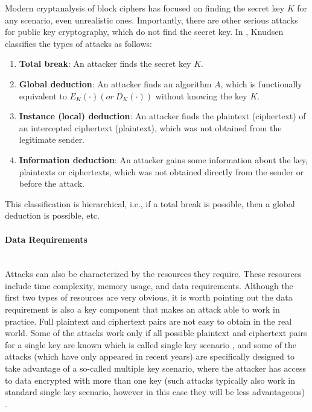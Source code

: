 Modern cryptanalysis of block ciphers has focused on finding the secret key $K$ for any scenario, even unrealistic ones. Importantly, there are other serious attacks for public key cryptography, which do not find the secret key. In \cite{knudsen1994block}, Knudsen classifies the types of attacks as follows:
\begin{enumerate}
	\item \textbf{Total break}: An attacker finds the secret key $K$.
	\item \textbf{Global deduction}: An attacker finds an algorithm $A$, which is functionally equivalent to $E_{K}(\cdot)(or\ D_{K}(\cdot))$ without knowing the key $K$.
	\item \textbf{Instance (local) deduction}: An attacker finds the plaintext (ciphertext) of an intercepted ciphertext (plaintext), which was not obtained from the legitimate sender.
	\item \textbf{Information deduction}: An attacker gains some information about the key, plaintexts or ciphertexts, which was not obtained directly from the sender or before the attack.
\end{enumerate} 
This classification is hierarchical, i.e., if a total break is possible, then a global deduction is possible, etc.

\paragraph{Data Requirements}  \mbox{} \\
Attacks can also be characterized by the resources they require. These resources include time complexity, memory usage, and data requirements. Although the first two types of resources are very obvious, it is worth pointing out the data requirement is also a key component that makes an attack able to work in practice. Full plaintext and ciphertext pairs are not easy to obtain in the real world. Some of the attacks work only if all possible plaintext and ciphertext pairs for a single key are known which is called single key scenario \cite{bouillaguet2012low}, and some of the attacks (which have only appeared in recent years) are specifically designed to take advantage of a so-called multiple key
scenario, where the attacker has access to data encrypted with more than
one key (such attacks typically also work in standard single key
scenario, however in this case they will be less advantageous) \cite{gostac,courtois2013cryptanalysis}. 

